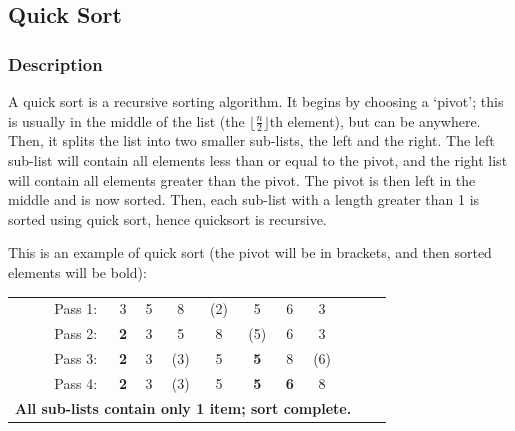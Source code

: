     \subsection{Quick Sort}
        \subsubsection{Description}
            A quick sort is a recursive sorting algorithm.
            It begins by choosing a `pivot'; this is usually in the middle of the list (the $\lfloor\frac{n}{2}\rfloor$th element), but can be anywhere.
            Then, it splits the list into two smaller sub-lists, the left and the right.
            The left sub-list will contain all elements less than or equal to the pivot, and the right list will contain all elements greater than the pivot.
            The pivot is then left in the middle and is now sorted.
            Then, each sub-list with a length greater than 1 is sorted using quick sort, hence quicksort is recursive.

            This is an example of quick sort (the pivot will be in brackets, and then sorted elements will be bold):
            \begin{center}
            \begin{tabular}{c c c c c c c c c c c c c}
                &&Pass 1: &3 &5 &8 &(2)  &5 &6 &3&& \\
                &&Pass 2: &\textbf{2} &3 &5 &8  &(5) &6 &3&& \\
                &&Pass 3: &\textbf{2} &3 &(3) &5 &\textbf{5} &8 &(6)&& \\
                &&Pass 4: &\textbf{2} &3 &(3) &5 &\textbf{5} &\textbf{6} &8&& \\
                \multicolumn{11}{c}{\textbf{All sub-lists contain only 1 item; sort complete.}}
            \end{tabular}
            \end{center}

